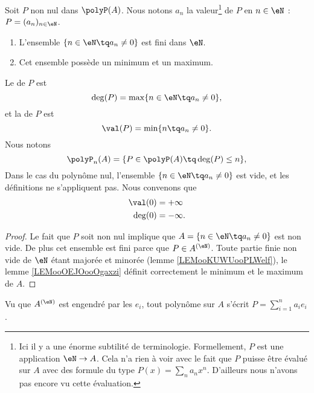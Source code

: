 \begin{propositionDef}  \label{DefDegrePoly}
	Soit \( P\) non nul dans \(\polyP(A)\). Nous notons \( a_n\) la valeur\footnote{Ici il y a une énorme subtilité de terminologie. Formellement, \( P\) est une application \( \eN\to A\). Cela n'a rien à voir avec le fait que \( P\) puisse être évalué sur \( A\) avec des formule du type \( P(x)=\sum_na_nx^n\). D'ailleurs nous n'avons pas encore vu cette évaluation.} de \( P\) en \( n\in \eN\) : \( P=(a_n)_{n\in \eN}\).
	\begin{enumerate}
		\item
		      L'ensemble \( \{ n\in \eN\tq a_n\neq 0 \}\) est fini dans \( \eN\).
		\item
		      Cet ensemble possède un minimum et un maximum.
	\end{enumerate}
	Le  de \( P\) est
	\begin{equation}
		\deg(P)=\max\{ n\in \eN\tq a_n\neq 0 \},
	\end{equation}
	et la  de \( P\) est
	\begin{equation}
		\val(P)=\min\{ n\tq a_n\neq 0 \}.
	\end{equation}
    Nous notons
    \begin{equation}
        \polyP_n(A)=\{ P\in \polyP(A)\tq \deg(P)\leq n \},
    \end{equation}
	Dans le cas du polynôme nul, l'ensemble \( \{ n\in \eN\tq a_n\neq 0 \}\) est vide, et les définitions ne s'appliquent pas. Nous convenons que
	\begin{subequations}
		\begin{align}
			\val(0) & =+\infty  \\
			\deg(0) & =-\infty.
		\end{align}
	\end{subequations}
\end{propositionDef}

\begin{proof}
	Le fait que \( P\) soit non nul implique que \( A=\{ n\in \eN\tq a_n\neq 0 \}\) est non vide. De plus cet ensemble est fini parce que \( P\in A^{(\eN)}\). Toute partie finie non vide de \( \eN\) étant majorée et minorée (lemme \ref{LEMooKUWUooPLWelf}), le lemme \ref{LEMooOEJOooOgaxzi} définit correctement le minimum et le maximum de \( A\).
\end{proof}

Vu que \( A^{(\eN)}\) est engendré par les \( e_i\), tout polynôme sur \( A\) s'écrit \( P=\sum_{i=1}^na_ie_i\).

